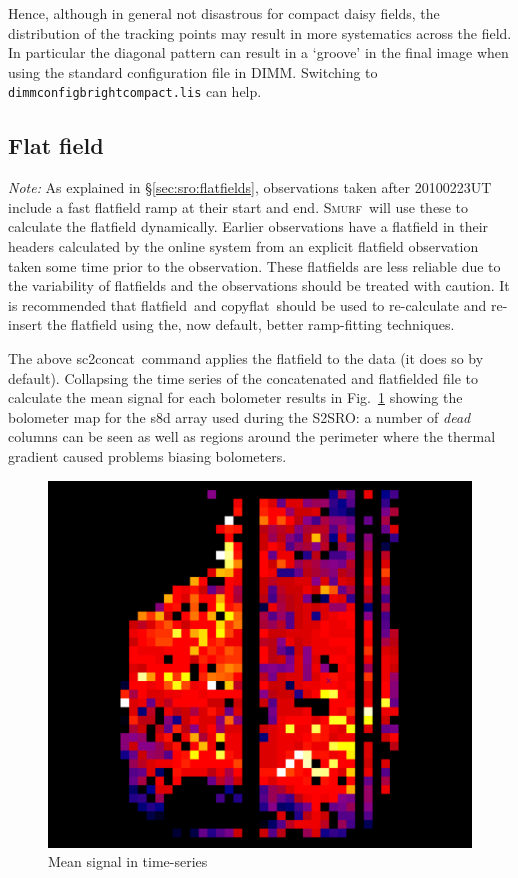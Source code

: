 \documentclass[twoside,11pt]{article}
\newcommand{\xref}[3]{#1}
\newcommand{\xlabel}[1]{}
\renewcommand{\_}{\texttt{\symbol{95}}}
\newcommand{\smurf}{\xref{\textsc{Smurf}}{sun258}{}}
\newcommand{\task}[1]{\textsf{#1}}
\newcommand{\copyflat}{\xref{\task{copyflat}}{sun258}{COPYFLAT}}
\newcommand{\concat}{\xref{\task{sc2concat}}{sun258}{SC2CONCAT}}
\newcommand{\flatfield}{\xref{\task{flatfield}}{sun258}{FLATFIELD}}
\begin{document}
Hence, although in general not disastrous for compact daisy fields,
the distribution of the tracking points may result in more systematics
across the field. In particular the diagonal pattern can result in a
`groove' in the final image when using the standard configuration file
in DIMM. Switching to \texttt{dimmconfig\_bright\_compact.lis}
can help.


\subsection{\xlabel{flatfield2}Flat field}
\label{sec:flatfield2}

\textsl{Note:} As explained in \S\ref{sec:sro:flatfields}, observations
taken after 20100223UT include a fast flatfield ramp at their start
and end. \smurf\ will use these to calculate the flatfield
dynamically. Earlier observations have a flatfield in their headers
calculated by the online system from an explicit flatfield observation
taken some time prior to the observation. These flatfields are less
reliable due to the variability of flatfields and the observations
should be treated with caution. It is recommended that \flatfield\ and
\copyflat\ should be used to re-calculate and re-insert the flatfield
using the, now default, better ramp-fitting techniques.

The above \concat\  command applies the flatfield to the data (it
does so by default). Collapsing the time series of the concatenated
and flatfielded file to calculate the mean signal for each bolometer
results in Fig.~\ref{fig:concollapse} showing the bolometer map for
the s8d array used during the S2SRO: a number of \textsl{dead} columns
can be seen as well as regions around the perimeter where the thermal
gradient caused problems biasing bolometers.

\begin{figure}[ht]
\begin{center}
\includegraphics[width=0.45\linewidth]{sc19_con_collapse}
\caption{Mean signal in time-series }
\label{fig:concollapse}
\end{center}
\end{figure}
\end{document}
